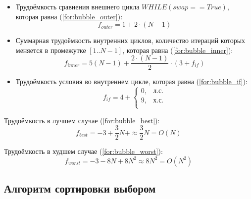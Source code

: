 \begin{itemize}
	\item Трудоёмкость сравнения внешнего цикла $WHILE(swap == True)$, которая равна (\ref{for:bubble_outer}):
	\begin{equation}
		\label{for:bubble_outer}
		f_{outer} = 1 + 2 \cdot (N - 1)
	\end{equation}
	\item Суммарная трудоёмкость внутренних циклов, количество итераций которых меняется в промежутке $[1..N-1]$, которая равна (\ref{for:bubble_inner}):
	\begin{equation}
		\label{for:bubble_inner}
		f_{inner} = 5(N - 1) + \frac{2 \cdot (N - 1)}{2} \cdot (3 + f_{if})
	\end{equation}
	\item Трудоёмкость условия во внутреннем цикле, которая равна (\ref{for:bubble_if}):
	\begin{equation}
		\label{for:bubble_if}
		f_{if} = 4 + \begin{cases}
			0, & \text{л.с.}\\
			9, & \text{х.с.}\\
		\end{cases}
	\end{equation}
\end{itemize}

Трудоёмкость в лучшем случае (\ref{for:bubble_best}):
\begin{equation}
	\label{for:bubble_best}
	f_{best} = -3 + \frac{3}{2} N + \approx \frac{3}{2} N = O(N)
\end{equation}

Трудоёмкость в худшем случае (\ref{for:bubble_worst}):
\begin{equation}
	\label{for:bubble_worst}
	f_{worst} = -3 - 8N + 8N^2 \approx 8N^2 = O(N^2)
\end{equation}



\subsection{Алгоритм сортировки выбором}


